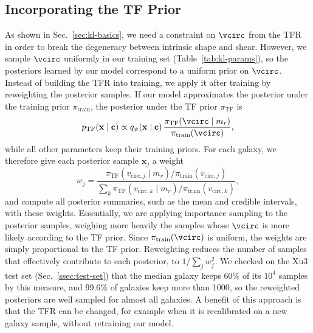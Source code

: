 \subsection{Incorporating the TF Prior}
\label{ssec:tf-prior}
As shown in Sec.~\ref{sec:kl-basics}, we need a constraint on $\vcirc$ from the TFR in order to break the degeneracy between intrinsic shape and shear. However, we sample $\vcirc$ uniformly in our training set (Table~\ref{tab:kl-params}), so the posteriors learned by our model correspond to a uniform prior on $\vcirc$. Instead of building the TFR into training, we apply it after training by reweighting the posterior samples. If our model approximates the posterior under the training prior $\pi_\mathrm{train}$, the posterior under the TF prior $\pi_\mathrm{TF}$ is
\begin{equation}
\label{eqn:tf-reweight}
    p_\mathrm{TF}(\mathbf{x} \mid \mathbf{c}) \propto q_\psi(\mathbf{x} \mid \mathbf{c})\, \frac{\pi_\mathrm{TF}(\vcirc \mid m_r)}{\pi_\mathrm{train}(\vcirc)},
\end{equation}
while all other parameters keep their training priors. For each galaxy, we therefore give each posterior sample $\mathbf{x}_j$ a weight
\begin{equation}
\label{eqn:tf-weights}
    w_j = \frac{\pi_\mathrm{TF}(v_{\mathrm{circ},j} \mid m_r)/\pi_\mathrm{train}(v_{\mathrm{circ},j})}{\sum_k \pi_\mathrm{TF}(v_{\mathrm{circ},k} \mid m_r)/\pi_\mathrm{train}(v_{\mathrm{circ},k})},
\end{equation}
and compute all posterior summaries, such as the mean and credible intervals, with these weights. Essentially, we are applying importance sampling to the posterior samples, weighing more heavily the samples whose $\vcirc$ is more likely according to the TF prior. Since $\pi_\mathrm{train}(\vcirc)$ is uniform, the weights are simply proportional to the TF prior. Reweighting reduces the number of samples that effectively contribute to each posterior, to $1/\sum_j w_j^2$. We checked on the Xu3 test set (Sec.~\ref{ssec:test-set}) that the median galaxy keeps 60\% of its $10^4$ samples by this measure, and 99.6\% of galaxies keep more than 1000, so the reweighted posteriors are well sampled for almost all galaxies. A benefit of this approach is that the TFR can be changed, for example when it is recalibrated on a new galaxy sample, without retraining our model.

